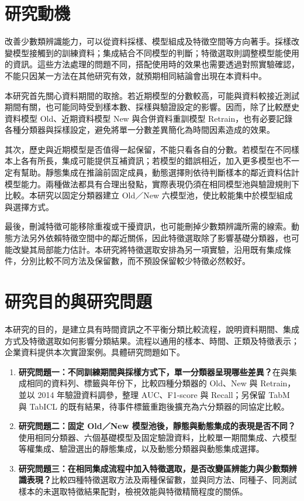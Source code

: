 \section{研究動機}

改善少數類辨識能力，可以從資料採樣、模型組成及特徵空間等方向著手。採樣改變模型接觸到的訓練資料；集成結合不同模型的判斷；特徵選取則調整模型能使用的資訊。這些方法處理的問題不同，搭配使用時的效果也需要透過對照實驗確認，不能只因某一方法在其他研究有效，就預期相同結論會出現在本資料中。

本研究首先關心資料期間的取捨。若近期模型的分數較高，可能與資料較接近測試期間有關，也可能同時受到樣本數、採樣與驗證設定的影響。因而，除了比較歷史資料模型 Old、近期資料模型 New 與合併資料重訓模型 Retrain，也有必要記錄各種分類器與採樣設定，避免將單一分數差異簡化為時間因素造成的效果。

其次，歷史與近期模型是否值得一起保留，不能只看各自的分數。若模型在不同樣本上各有所長，集成可能提供互補資訊；若模型的錯誤相近，加入更多模型也不一定有幫助。靜態集成在推論前固定成員，動態選擇則依待判斷樣本的鄰近資料估計模型能力。兩種做法都具有合理出發點，實際表現仍須在相同模型池與驗證規則下比較。本研究以固定分類器建立 Old／New 六模型池，使比較能集中於模型組成與選擇方式。

最後，刪減特徵可能移除重複或干擾資訊，也可能刪掉少數類辨識所需的線索。動態方法另外依賴特徵空間中的鄰近關係，因此特徵選取除了影響基礎分類器，也可能改變其局部能力估計。本研究將特徵選取安排為另一項實驗，沿用既有集成條件，分別比較不同方法及保留數，而不預設保留較少特徵必然較好。

\section{研究目的與研究問題}

本研究的目的，是建立具有時間資訊之不平衡分類比較流程，說明資料期間、集成方式及特徵選取如何影響分類結果。流程以通用的樣本、時間、正類及特徵表示；企業資料提供本次實證案例。具體研究問題如下。

\begin{enumerate}
\item \textbf{研究問題一：不同訓練期間與採樣方式下，單一分類器呈現哪些差異？}在與集成相同的資料列、標籤與年份下，比較四種分類器的 Old、New 與 Retrain，並以 2014 年驗證資料調參，整理 AUC、F1-score 與 Recall；另保留 TabM 與 TabICL 的既有結果，待事件標籤重跑後擴充為六分類器的同協定比較。
\item \textbf{研究問題二：固定 Old／New 模型池後，靜態與動態集成的表現是否不同？}使用相同分類器、六個基礎模型及固定驗證資料，比較單一期間集成、六模型等權集成、驗證選出的靜態集成，以及動態分類器與動態集成選擇。
\item \textbf{研究問題三：在相同集成流程中加入特徵選取，是否改變區辨能力與少數類辨識表現？}比較四種特徵選取方法及兩種保留數，並與同方法、同種子、同測試樣本的未選取特徵結果配對，檢視效能與特徵精簡程度的關係。
\end{enumerate}

